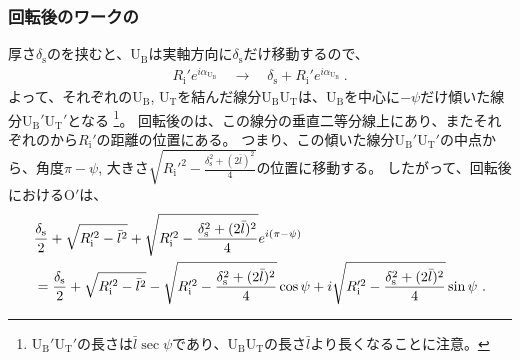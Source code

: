 \subsubsection{回転後のワークの\nameCurvatureCenter}
厚さ$\delta_\mathrm s$の\Spacer を挟むと、\TopSideReceiverPlateCenter U$_\mathrm B$は実軸方向に$\delta_\mathrm s$だけ移動するので、
\begin{align*}
  R_\mathrm i'e^{i\alpha_{\mathrm U_\mathrm B}}
  \quad\longrightarrow\quad
  \delta_\mathrm s+R_\mathrm i'e^{i\alpha_{\mathrm U_\mathrm B}}\ .
\end{align*}
よって、それぞれの\ReceiverPlateCenter U$_\mathrm B$, U$_\mathrm T$を結んだ線分U$_\mathrm B$U$_\mathrm T$は、U$_\mathrm B$を中心に$-\psi$だけ傾いた線分U$_\mathrm B'$U$_\mathrm T'$となる
\footnote{%
U$_\mathrm B'$U$_\mathrm T'$の長さは$\bar l\sec\psi$であり、U$_\mathrm B$U$_\mathrm T$の長さ$\bar l$より長くなることに注意。}。
回転後の\nameCurvatureCenter は、この線分の垂直二等分線上にあり、またそれぞれの\ReceiverPlateCenter から$R_\mathrm i'$の距離の位置にある。
つまり、この傾いた線分U$_\mathrm B'$U$_\mathrm T'$の中点から、角度$\pi-\psi$, 大きさ$\sqrt{R_\mathrm i'^2-\frac{\delta_\mathrm s^2+(2\bar l)^2}4}$の位置に移動する。
したがって、回転後における\CurvatureCenter O$'$は、
\begin{align}
  \notag
  & \frac{\delta_\mathrm s}2+\sqrt{R_\mathrm i'^2-\bar l^2}
    +\sqrt{R_\mathrm i'^2-\frac{\delta_\mathrm s^2+(2\bar l)^2}4}e^{i(\pi-\psi)}\\
  & = \frac{\delta_\mathrm s}2+\sqrt{R_\mathrm i'^2-\bar l^2}-\sqrt{R_\mathrm i'^2-\frac{\delta_\mathrm s^2+(2\bar l)^2}4}\cos\psi
      +i\sqrt{R_\mathrm i'^2-\frac{\delta_\mathrm s^2+(2\bar l)^2}4}\sin\psi\ .
    \label{eq:afterOrgin}
\end{align}

